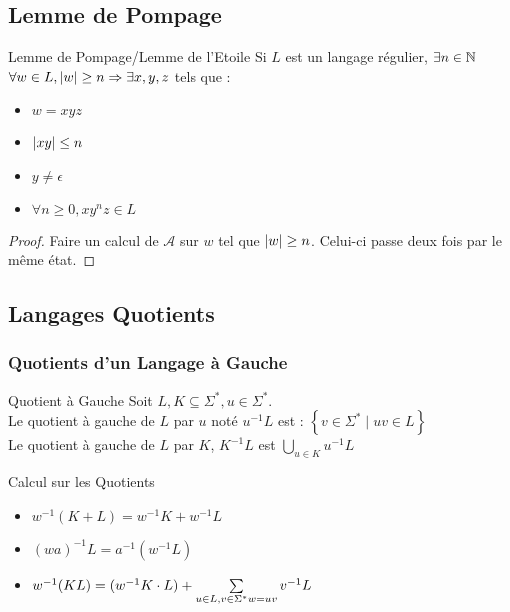 \documentclass{cours}
\begin{document}
\subsection{Lemme de Pompage}
\begin{théorème}{Lemme de Pompage/Lemme de l'Etoile}{}
    Si $L$ est un langage régulier, $\exists n \in \mathbb{N}$ 
    $\forall w \in L, \left|w\right| \geq n \Rightarrow \exists x, y, z$ tels que : 
        \begin{itemize}
            \item $w = xyz$
            \item $\left|xy\right| \leq n$
            \item $y \neq \epsilon$
            \item $\forall n \geq 0, xy^{n}z \in L$
        \end{itemize}
\end{théorème}
\begin{proof}
    Faire un calcul de $\mathcal{A}$ sur $w$ tel que $\left|w\right| \geq n$. Celui-ci passe deux fois par le même état.
\end{proof}

\subsection{Langages Quotients}
\subsubsection{Quotients d'un Langage à Gauche}
\begin{définition}{Quotient à Gauche}{}
    Soit $L, K \subseteq \Sigma^{*}, u \in \Sigma^{*}$. \\
    Le quotient à gauche de $L$ par $u$ noté $u^{-1}L$ est : $\left\{v \in \Sigma^{*} \mid uv \in L\right\}$\\
    Le quotient à gauche de $L$ par $K$, $K^{-1}L$ est $\bigcup_{u \in K}u^{-1}L$
\end{définition}

\begin{propositionfr}{Calcul sur les Quotients}{}
    \begin{itemize}
        \item $w^{-1}(K+L) = w^{-1}K + w^{-1}L$
        \item $(wa)^{-1}L = a^{-1}(w^{-1}L)$
        \item $w^{-1}(KL) = (w^{-1}K \cdot L) + \sum\limits_{u \in L, v \in \Sigma^{*}\\ w = uv} v^{-1}L$
    \end{itemize}
\end{propositionfr}
\end{document}
